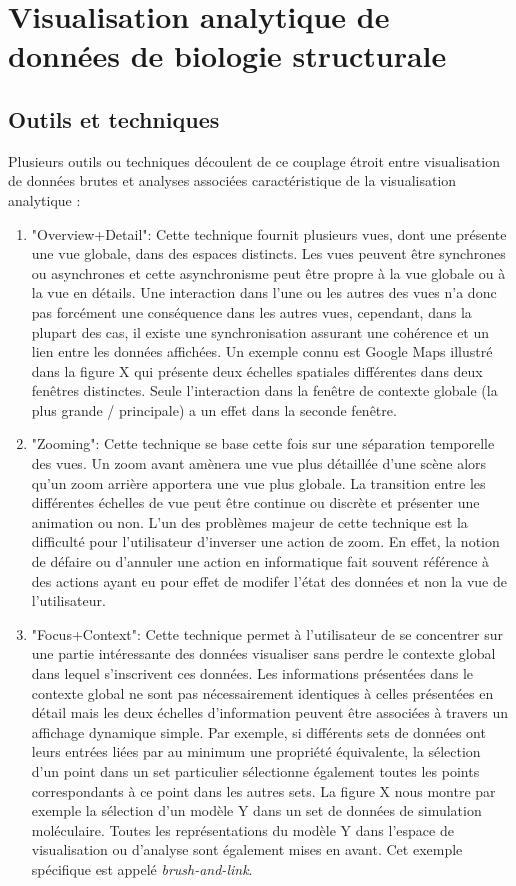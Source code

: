 \section{Visualisation analytique de données de biologie structurale}
\label{Sec:visuAnalyticsStructBio}

\subsection{Outils et techniques}

Plusieurs outils ou techniques découlent de ce couplage étroit entre visualisation de données brutes et analyses associées caractéristique de la visualisation analytique \cite{cockburn2008review}:

\begin{enumerate}
    \item "Overview+Detail": Cette technique fournit plusieurs vues, dont une présente une vue globale, dans des espaces distincts. Les vues peuvent être synchrones ou asynchrones et cette asynchronisme peut être propre à la vue globale ou à la vue en détails. Une interaction dans l'une ou les autres des vues n'a donc pas forcément une conséquence dans les autres vues, cependant, dans la plupart des cas, il existe une synchronisation assurant une cohérence et un lien entre les données affichées. Un exemple connu est Google Maps illustré dans la figure X qui présente deux échelles spatiales différentes dans deux fenêtres distinctes. Seule l'interaction dans la fenêtre de contexte globale (la plus grande / principale) a un effet dans la seconde fenêtre.
    \item "Zooming": Cette technique se base cette fois sur une séparation temporelle des vues. Un zoom avant amènera une vue plus détaillée d'une scène alors qu'un zoom arrière apportera une vue plus globale. La transition entre les différentes échelles de vue peut être continue ou discrète et présenter une animation ou non. L'un des problèmes majeur de cette technique est la difficulté pour l'utilisateur d'inverser une action de zoom. En effet, la notion de défaire ou d'annuler une action en informatique fait souvent référence à des actions ayant eu pour effet de modifer l'état des données et non la vue de l'utilisateur.
    \item "Focus+Context": Cette technique permet à l'utilisateur de se concentrer sur une partie intéressante des données visualiser sans perdre le contexte global dans lequel s'inscrivent ces données. Les informations présentées dans le contexte global ne sont pas nécessairement identiques à celles présentées en détail mais les deux échelles d'information peuvent être associées à travers un affichage dynamique simple. Par exemple, si différents sets de données ont leurs entrées liées par au minimum une propriété équivalente, la sélection d'un point dans un set particulier sélectionne également toutes les points correspondants à ce point dans les autres sets. La figure X nous montre par exemple la sélection d'un modèle Y dans un set de données de simulation moléculaire. Toutes les représentations du modèle Y dans l'espace de visualisation ou d'analyse sont également mises en avant. Cet exemple spécifique est appelé \textit{brush-and-link}.

\end{enumerate}

